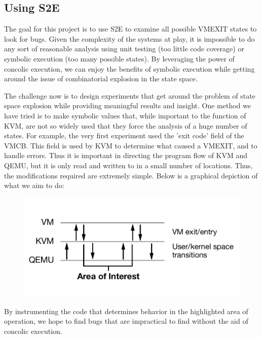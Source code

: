 \documentclass[11pt]{article}
\begin{document}
\subsection{Using S2E}
The goal for this project is to use S2E to examine all possible VMEXIT states to
look for bugs. Given the complexity of the systems at play, it is impossible to
do any sort of reasonable analysis using unit testing (too little code coverage)
or symbolic execution (too many possible states). By leveraging the power of
concolic execution, we can enjoy the benefits of symbolic execution while
getting around the issue of combinatorial explosion in the state space. \par

The challenge now is to design experiments that get around the problem of state
space explosion while providing meaningful results and insight. One method we
have tried is to make symbolic values that, while important to the function of
KVM, are not so widely used that they force the analysis of a huge number of
states. For example, the very first experiment used the 'exit\textunderscore
code' field of the VMCB. This field is used by KVM to determine what caused a
VMEXIT, and to handle errors. Thus it is important in directing the program flow
of KVM and QEMU, but it is only read and written to in a small number of
locations. Thus, the modifications required are extremely simple. Below is a
graphical depiction of what we aim to do:
\begin{figure}[htp]
\centering
    \includegraphics[scale=.7]{qemu_trap.pdf}
\end{figure}
\newpage
By instrumenting the code that determines behavior in the highlighted area of
operation, we hope to find bugs that are impractical to find without the aid of
concolic execution.
\end{document}
